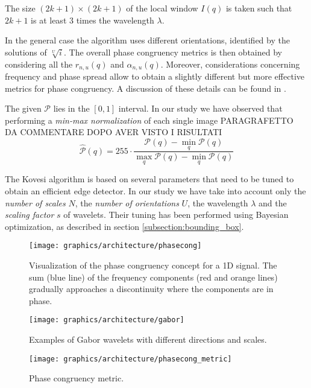 	    \par{
	    	The size $(2k+1)\times(2k+1)$ of the local window $I(q)$ is taken such that $2k+1$ is at least $3$ times the wavelength $\lambda$.
		}
        \par{
        	In the general case the algorithm uses different orientations, identified by the solutions of $\sqrt[U]{i}$. The overall phase congruency metrics is then obtained by considering all the $r_{n,u}(q)$ and $\alpha_{n,u}(q)$. Moreover, considerations concerning frequency and phase spread allow to obtain a slightly different but more effective metrics for phase congruency. A discussion of these details can be found in \cite{mit:kovesiphase}.
        }
        \par{
        	The given $\mathcal{P}$ lies in the $[0,1]$ interval. In our study we have observed that performing a \emph{min-max normalization} of each single image
        	PARAGRAFETTO DA COMMENTARE DOPO AVER VISTO I RISULTATI
        	\begin{equation*}
        	\hat{\mathcal{P}}(q) = 255 \cdot \frac{\mathcal{P}(q)-\min_q\mathcal{P}(q)}{\max_q\mathcal{P}(q)-\min_q\mathcal{P}(q)}
        	\end{equation*}
        }
        \par{
        	The Kovesi algorithm is based on several parameters that need to be tuned to obtain an efficient edge detector. In our study we have take into account only the \emph{number of scales} $N$, the \emph{number of orientations} $U$, the wavelength $\lambda$ and the \emph{scaling factor} $s$ of wavelets. Their tuning has been performed using Bayesian optimization, as described in section \ref{subsection:bounding_box}.
        }
	    \begin{figure}
		    \centering
		    \texttt{[image: graphics/architecture/phasecong]}
		    \caption{Visualization of the phase congruency concept for a 1D signal. The sum (blue line) of the frequency components (red and orange lines) gradually approaches a discontinuity where the components are in phase.}
		    \label{fig:phase-congruency}
		\end{figure}
		\begin{figure}
			\centering
			\texttt{[image: graphics/architecture/gabor]}
			\caption{Examples of Gabor wavelets with different directions and scales.}
			\label{fig:gabor}
		\end{figure}
	    \begin{figure}
	    	\centering
	    	\texttt{[image: graphics/architecture/phasecong\_metric]}
	    	\caption{Phase congruency metric.}
	    	\label{fig:phase-congruency-metric}
	    \end{figure}
